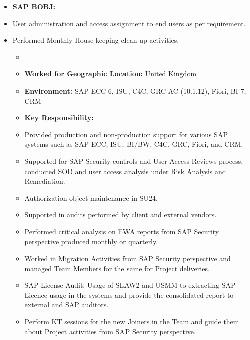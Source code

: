 \documentclass[10pt]{article}
\begin{document}
	\begin{itemize}
		\small
     		\item[] \textbf{\underline{SAP BOBJ:}} 
        		\item User administration and access assignment to end users as per requirement.
				\item Performed Monthly House-keeping clean-up activities.
	
		\begin{itemize}

	       		 \item[]  
        			\item[\ding{226}] \textbf {Worked for Geographic Location:} United Kingdom
    		
			\item[] \textbf {Environment: } SAP ECC 6, ISU, C4C, GRC AC (10.1,12), Fiori, BI 7, CRM
		\end{itemize}
		
		\begin{itemize}
			\item[] \textbf {Key Responsibility:}
				\item Provided production and non-production support for various SAP systems such as SAP ECC, ISU, BI/BW, C4C, GRC, Fiori, and CRM.
				\item Supported for SAP Security controls and User Access Reviews process, conducted SOD and user access analysis under Risk Analysis and Remediation.
				\item Authorization object maintenance in SU24.
				\item Supported in audits performed by client and external vendors.
				\item Performed critical analysis on EWA reports from SAP Security perspective produced monthly or quarterly.
				\item Worked in Migration Activities from SAP Security perspective and managed Team Members for the same for Project deliveries.
				\item SAP License Audit: Usage of SLAW2 and USMM to extracting SAP Licence usage in the systems and provide the consolidated report to external and SAP auditors.
				\item Perform KT sessions for the new Joiners in the Team and guide them about Project activities from SAP Security perspective.
		\end{itemize}
	\end{itemize}
\end{document}
